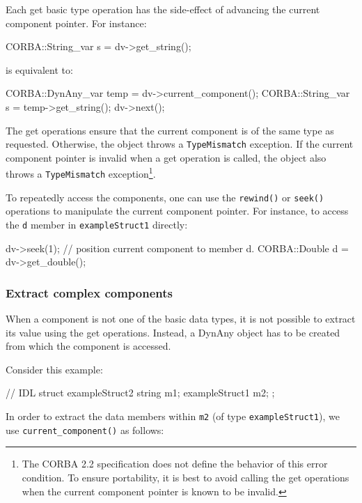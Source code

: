 \documentclass[11pt,twoside,a4paper]{book}
\newcommand{\type}[1]{\texttt{#1}}
\newcommand{\code}[1]{\texttt{#1}}
\newcommand{\op}[1]{\texttt{#1()}}
\begin{document}
Each get basic type operation has the side-effect of advancing the
current component pointer. For instance:

\begin{cxxlisting}
CORBA::String_var s = dv->get_string();
\end{cxxlisting}

is equivalent to:

\begin{cxxlisting}
CORBA::DynAny_var temp = dv->current_component();
CORBA::String_var s = temp->get_string();
dv->next();
\end{cxxlisting}

The get operations ensure that the current component is of the same
type as requested. Otherwise, the object throws a \code{TypeMismatch}
exception. If the current component pointer is invalid when a get
operation is called, the object also throws a \code{TypeMismatch}
exception\footnote{The CORBA 2.2 specification does not define the
behavior of this error condition. To ensure portability, it is best to
avoid calling the get operations when the current component pointer is
known to be invalid.}.

To repeatedly access the components, one can use the \op{rewind} or
\op{seek} operations to manipulate the current component pointer. For
instance, to access the \code{d} member in \type{exampleStruct1}
directly:

\begin{cxxlisting}
dv->seek(1);       // position current component to member d.
CORBA::Double d = dv->get_double();
\end{cxxlisting}

\subsubsection{Extract complex components}

When a component is not one of the basic data types, it is not
possible to extract its value using the get operations. Instead, a
DynAny object has to be created from which the component is accessed.

Consider this example:

\begin{idllisting}
// IDL
struct exampleStruct2 {
  string m1;
  exampleStruct1 m2;
};
\end{idllisting}

In order to extract the data members within \code{m2} (of type
\type{exampleStruct1}), we use \op{current\_component} as follows:
\end{document}

